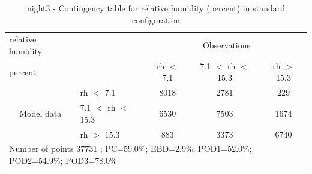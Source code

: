 \begin{table}[p!]
\begin{center}
\begin{tabular}{llccc}
\hline
{relative humidity}                                       &                                                    & \multicolumn{3}{c}{Observations}                 \\
{percent}                                       &                             & rh $<$ 7.1   & 7.1 $<$ rh $<$ 15.3 & rh $>$ 15.3 \\
\hline
\multicolumn{1}{c}{\multirow{3}{*}{Model data}}  & rh $<$ 7.1             & 8018                & 2781                       & 229              \\
                                                 & 7.1  $<$ rh $<$ 15.3 & 6530                & 7503                       & 1674              \\
                                                 & rh $>$ 15.3             & 883                & 3373                       & 6740              \\
\hline
\multicolumn{5}{l}{ Number of points        37731 ; PC=59.0\%; EBD=2.9\%; POD1=52.0\%; POD2=54.9\%; POD3=78.0\%}
\end{tabular}
\end{center}
\caption{night3 - Contingency table for  relative humidity (percent) in standard configuration}
\label{tab:contingencyrhBEF:night3}
\end{table}
